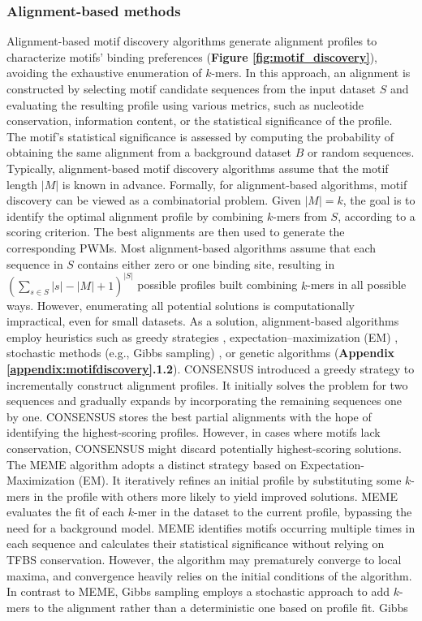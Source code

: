 \documentclass[a4paper, titlepage, openright]{book}
\begin{document}
\subsubsection{Alignment-based methods}
Alignment-based motif discovery algorithms generate alignment profiles to characterize motifs' binding preferences (\textbf{Figure \ref{fig:motif_discovery}}), avoiding the exhaustive enumeration of $k$-mers. In this approach, an alignment is constructed by selecting motif candidate sequences from the input dataset $S$ and evaluating the resulting profile using various metrics, such as nucleotide conservation, information content, or the statistical significance of the profile. The motif's statistical significance is assessed by computing the probability of obtaining the same alignment from a background dataset $B$ or random sequences. Typically, alignment-based motif discovery algorithms assume that the motif length $|M|$ is known in advance. Formally, for alignment-based algorithms, motif discovery can be viewed as a combinatorial problem. Given $|M| = k$, the goal is to identify the optimal alignment profile by combining $k$-mers from $S$, according to a scoring criterion. The best alignments are then used to generate the corresponding PWMs. Most alignment-based algorithms assume that each sequence in $S$ contains either zero or one binding site, resulting in $(\sum_{s \in S}{|s| - |M| + 1})^{|S|}$ possible profiles built combining $k$-mers in all possible ways. However, enumerating all potential solutions is computationally impractical, even for small datasets. As a solution, alignment-based algorithms employ heuristics such as greedy strategies \citep{hertz1999identifying}, expectation–maximization (EM) \citep{bailey1994fitting}, stochastic methods (e.g., Gibbs sampling) \citep{lawrence1993detecting}, or genetic algorithms \citep{lee2018comprehensive} (\textbf{Appendix \ref{appendix:motifdiscovery}.1.2}). CONSENSUS \citep{hertz1999identifying} introduced a greedy strategy to incrementally construct alignment profiles. It initially solves the problem for two sequences and gradually expands by incorporating the remaining sequences one by one. CONSENSUS stores the best partial alignments with the hope of identifying the highest-scoring profiles. However, in cases where motifs lack conservation, CONSENSUS might discard potentially highest-scoring solutions. The MEME algorithm \citep{bailey1994fitting,bailey1995value,bailey2006meme} adopts a distinct strategy based on Expectation-Maximization (EM). It iteratively refines an initial profile by substituting some $k$-mers in the profile with others more likely to yield improved solutions. MEME evaluates the fit of each $k$-mer in the dataset to the current profile, bypassing the need for a background model. MEME identifies motifs occurring multiple times in each sequence and calculates their statistical significance without relying on TFBS conservation. However, the algorithm may prematurely converge to local maxima, and convergence heavily relies on the initial conditions of the algorithm. In contrast to MEME, Gibbs sampling \citep{lawrence1990expectation} employs a stochastic approach to add $k$-mers to the alignment rather than a deterministic one based on profile fit. Gibbs 
\end{document}

